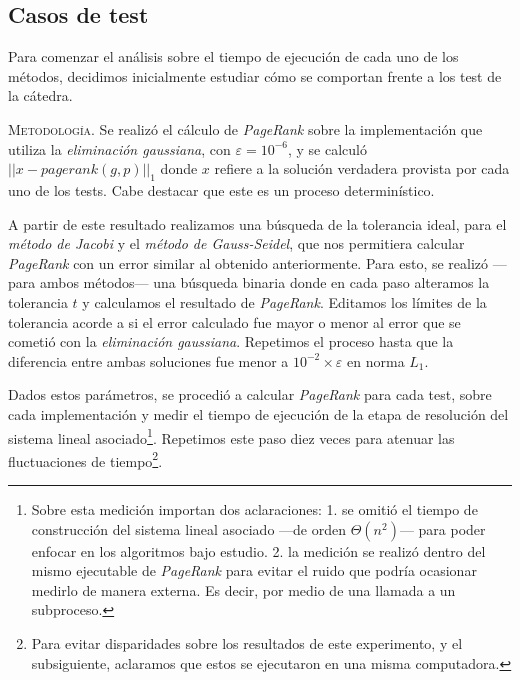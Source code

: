 \subsection{Casos de test}

Para comenzar el análisis sobre el tiempo de ejecución de cada uno de los métodos, decidimos inicialmente estudiar cómo se comportan frente a los test de la cátedra. %

\vspace{1em}
\noindent\textsc{Metodología}. Se realizó el cálculo de \textit{PageRank} sobre la implementación que utiliza la \textit{eliminación gaussiana}, con $\varepsilon = 10^{-6}$, y se calculó $||x - pagerank(g, p)||_1$ donde $x$ refiere a la solución verdadera provista por cada uno de los tests. Cabe destacar que este es un proceso determinístico. 

A partir de este resultado realizamos una búsqueda de la tolerancia ideal, para el \textit{método de Jacobi} y el \textit{método de Gauss-Seidel}, que nos permitiera calcular \textit{PageRank} con un error similar al obtenido anteriormente. Para esto, se realizó ---para ambos métodos--- una búsqueda binaria donde en cada paso alteramos la tolerancia $t$ y calculamos el resultado de \textit{PageRank}. Editamos los límites de la tolerancia acorde a si el error calculado fue mayor o menor al error que se cometió con la \textit{eliminación gaussiana}. Repetimos el proceso hasta que la diferencia entre ambas soluciones fue menor a $10^{-2} \times \varepsilon$ en norma $L_1$. %


Dados estos parámetros, se procedió a calcular \textit{PageRank} para cada test, sobre cada implementación y medir el tiempo de ejecución de la etapa de resolución del sistema lineal asociado\footnote{Sobre esta medición importan dos aclaraciones: 1. se omitió el tiempo de construcción del sistema lineal asociado ---de orden $\Theta(n^2)$--- para poder enfocar en los algoritmos bajo estudio. 2. la medición se realizó dentro del mismo ejecutable de \textit{PageRank} para evitar el ruido que podría ocasionar medirlo de manera externa. Es decir, por medio de una llamada a un subproceso.}. Repetimos este paso diez veces para atenuar las fluctuaciones de tiempo\footnote{Para evitar disparidades sobre los resultados de este experimento, y el subsiguiente, aclaramos que estos se ejecutaron en una misma computadora.}. 

